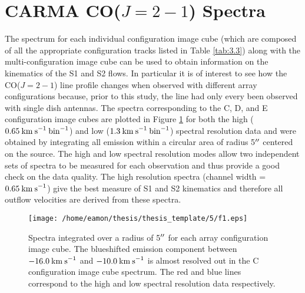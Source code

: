 \section{CARMA CO($J=2-1$) Spectra}\label{sec:5.3}
The spectrum for each individual configuration image cube (which are composed of all the appropriate configuration tracks listed in Table \ref{tab:3.3}) along with the multi-configuration image cube can be used to obtain information on the kinematics of the S1 and S2 flows. In particular it is of interest to see how the CO($J=2-1$) line profile changes when observed  with different array configurations because, prior to this study, the line had only every been observed with single dish antennas. The spectra corresponding  to the C, D, and E configuration image cubes are plotted in Figure \ref{fig:5.4} for both the high ($0.65\>{\rm km\>s}^{-1}\> \rm{bin}^{-1}$) and low ($1.3\>{\rm km\>s}^{-1}\> \rm{bin}^{-1}$) spectral resolution data and were obtained by integrating all emission within a circular area of radius 5$^{\prime\prime}$ centered on the source. The high and low spectral resolution modes allow two independent sets of spectra to be measured for each observation and thus provide a good check on the data quality. The high resolution  spectra (channel width = $0.65\>{\rm km\>s}^{-1}$) give the best measure of S1 and S2 kinematics and therefore all outflow velocities are derived from these spectra.

\begin{figure}[!ht]
\centering 
\texttt{[image: /home/eamon/thesis/thesis\_template/5/f1.eps]}
\caption{Spectra integrated over a radius of 5$^{\prime\prime}$ for each array configuration image cube. The blueshifted emission component between $-16.0\>{\rm km\>s}^{-1}$ and $-10.0\>{\rm km\>s}^{-1}$ is almost resolved out in the C configuration image cube spectrum. The red and blue lines correspond to the high and low spectral resolution data respectively.}
\label{fig:5.4}
\end{figure}

